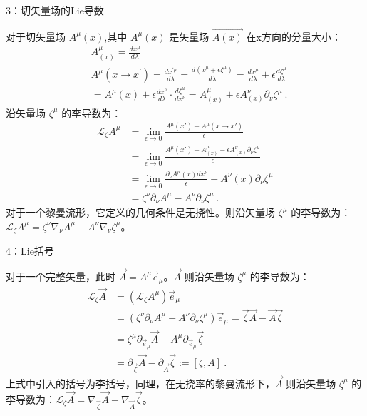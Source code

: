 3：切矢量场的Lie导数

对于切矢量场 $A^{\mu}(x)$,其中 $A^{\mu}(x)$ 是矢量场 $\overrightarrow{A(x)}$ 在x方向的分量大小：
$$\begin{aligned}
&A^{\mu}_{(x)}=\frac{d x^{\mu}}{d \lambda}\\
&A^{\mu}\left(x \rightarrow x^{\prime}\right)=\frac{d x^{\prime \mu}}{d \lambda}=\frac{d\left(x^{\mu}+\epsilon \zeta^{\mu}\right)}{d \lambda}=\frac{d x^{\mu}}{d \lambda}+\epsilon\frac{d \zeta^{\mu}}{d \lambda} \\
&=A^{\mu}(x)+\epsilon \frac{d x^{\nu}}{d \lambda} \cdot \frac{d \zeta^{\mu}}{dx^{\nu}} =A^{\mu}_{(x)}+\epsilon A_{(x)}^{\nu}\partial_{\nu}\zeta^{\mu}~.
\end{aligned}$$
沿矢量场 $\zeta^{\mu}$ 的李导数为：
$$\begin{aligned}
\mathcal{L}_{\zeta} A^{\mu} &=\lim _{\epsilon \rightarrow 0} \frac{A^{\mu}(x')-A^{\mu}(x \rightarrow x')}{\epsilon} \\
&=\lim _{\epsilon \rightarrow 0} \frac{A^{\mu}(x')-A^{\mu}_{(x)}-\epsilon A_{(x)}^{\nu}\partial_{\nu}\zeta^{\mu}}{\epsilon} \\
&=\lim _{\epsilon \rightarrow 0} \frac{\partial_{\nu} A^{\mu}(x) d x^{\nu}}{\epsilon}-A^{\nu}(x) \partial_{\nu} \zeta^{\mu} \\
&=\zeta^{\nu} \partial_{\nu} A^{\mu}-A^{\nu} \partial_{\nu} \zeta^{\mu}~.
\end{aligned}$$
对于一个黎曼流形，它定义的几何条件是无挠性。则沿矢量场 $\zeta^{\mu}$ 的李导数为：$\mathcal{L}_{\zeta} A^{\mu}=\zeta^{\nu} \nabla_{\nu} A^{\mu}-A^{\nu} \nabla_{\nu} \zeta^{\mu}$。

 4：Lie括号

对于一个完整矢量，此时 $\overrightarrow{A}=A^{\mu}\overrightarrow{e}_{\mu}$。$\overrightarrow{A}$ 则沿矢量场 $\zeta^{\mu}$ 的李导数为：
$$\begin{aligned}
\mathcal{L}_{\zeta} \overrightarrow{A} &=\left(\mathcal{L}_{\zeta} A^{\mu}\right)\overrightarrow{e}_{\mu}  \\
&=\left(\zeta^{\nu} \partial_{\nu} A^{\mu}-A^{\nu} \partial_{\nu} \zeta^{\mu}\right) \overrightarrow{e}_{\mu} =\overrightarrow{\zeta} \overrightarrow{A}-\overrightarrow{A} \overrightarrow{\zeta} \\
&=\zeta^{\mu} \partial_{\overrightarrow{e}_{\mu}} \overrightarrow{A}-A^{\mu} \partial_{\overrightarrow{e}_{\mu}} \overrightarrow{\zeta}\\
&=\partial_{\overrightarrow{\zeta}} \overrightarrow{A}-\partial_{\overrightarrow{A}} \overrightarrow{\zeta}:=[\zeta, A]~.
\end{aligned}$$
上式中引入的括号为李括号，同理，在无挠率的黎曼流形下，$\overrightarrow{A}$ 则沿矢量场 $\zeta^{\mu}$ 的李导数为：$\mathcal{L}_{\zeta} \overrightarrow{A}=\nabla_{\overrightarrow{\zeta}} \overrightarrow{A}-\nabla_{\overrightarrow{A}} \overrightarrow{\zeta}$。

